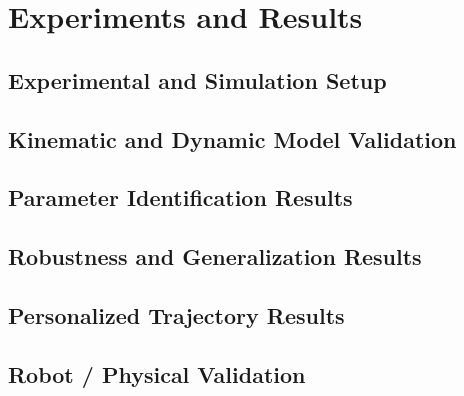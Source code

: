 \section{Experiments and Results}

\subsection{Experimental and Simulation Setup}
\subsection{Kinematic and Dynamic Model Validation}
\subsection{Parameter Identification Results}
\subsection{Robustness and Generalization Results}
\subsection{Personalized Trajectory Results}
\subsection{Robot / Physical Validation}
